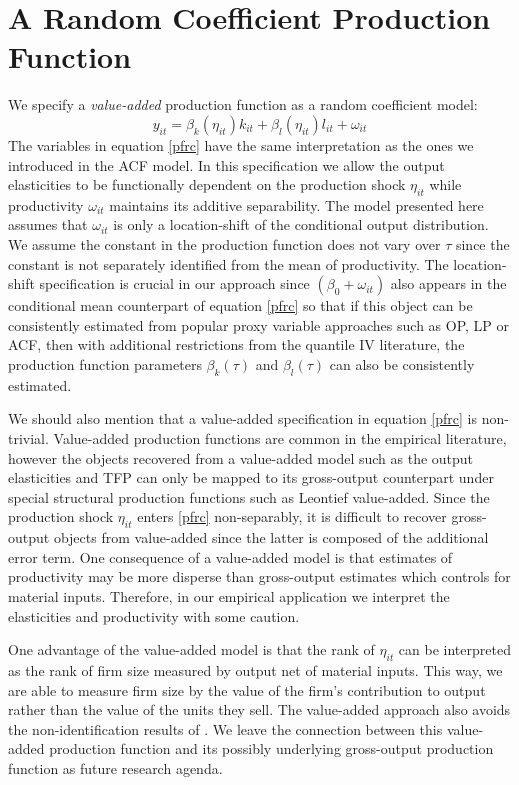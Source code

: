 \documentclass[11pt]{article}
\begin{document}
\section{A Random Coefficient Production Function} \label{ourmodel}
We specify a \textit{value-added} production function as a random coefficient model:
\begin{equation} \label{pfrc}
    y_{it}=\beta_{k}(\eta_{it})k_{it}+\beta_{l}(\eta_{it})l_{it}+\omega_{it}
\end{equation}
The variables in equation \eqref{pfrc} have the same interpretation as the ones we introduced in the ACF model. In this specification we allow the output elasticities to be functionally dependent on the production shock $\eta_{it}$ while productivity $\omega_{it}$ maintains its additive separability. The model presented here assumes that $\omega_{it}$ is only a location-shift of the conditional output distribution. We assume the constant in the production function does not vary over $\tau$ since the constant is not separately identified from the mean of productivity. The location-shift specification is crucial in our approach since $(\beta_{0}+\omega_{it})$ also appears in the conditional mean counterpart of equation \eqref{pfrc} so that if this object can be consistently estimated from popular proxy variable approaches such as OP, LP or ACF, then with additional restrictions from the quantile IV literature, the production function parameters $\beta_{k}(\tau)$ and $\beta_{l}(\tau)$ can also be consistently estimated.

We should also mention that a value-added specification in equation \eqref{pfrc} is non-trivial. Value-added production functions are common in the empirical literature, however the objects recovered from a value-added model such as the output elasticities and TFP can only be mapped to its gross-output counterpart under special structural production functions such as Leontief value-added. Since the production shock $\eta_{it}$ enters \eqref{pfrc} non-separably, it is difficult to recover gross-output objects from value-added since the latter is composed of the additional error term. One consequence of a value-added model is that estimates of productivity may be more disperse than gross-output estimates which controls for material inputs. Therefore, in our empirical application we interpret the elasticities and productivity with some caution.

 One advantage of the value-added model is that the rank of $\eta_{it}$ can be interpreted as the rank of firm size measured by output net of material inputs. This way, we are able to measure firm size by the value of the firm's contribution to output rather than the value of the units they sell. The value-added approach also avoids the non-identification results of \cite{Gandhi2020}. We leave the connection between this value-added production function and its possibly underlying gross-output production function as future research agenda.
\end{document}
